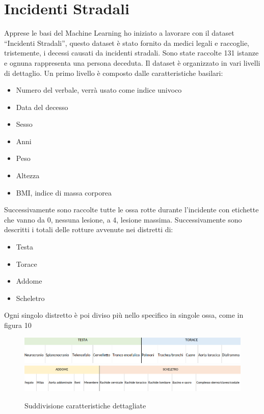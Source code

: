 \documentclass[12pt,italian]{report}
\begin{document}
\section{Incidenti Stradali}
Apprese le basi del Machine Learning ho iniziato a lavorare con il dataset ``Incidenti Stradali'', questo dataset è stato fornito da medici legali e raccoglie, tristemente, i decessi causati da incidenti stradali. Sono state raccolte 131 istanze e ognuna rappresenta una persona deceduta. Il dataset è organizzato in vari livelli di dettaglio. Un primo livello è composto dalle  caratteristiche basilari:
\begin{itemize}
	\item Numero del verbale, verrà usato come indice univoco
	\item Data del decesso
	\item Sesso
	\item Anni
	\item Peso
	\item Altezza
	\item BMI, indice di massa corporea
\end{itemize}
Successivamente sono raccolte tutte le ossa rotte durante l'incidente con etichette che vanno da 0, nessuna lesione, a 4, lesione massima.
Successivamente sono descritti i totali delle rotture avvenute nei distretti di:
\begin{itemize}
	\item Testa
	\item Torace
	\item Addome
	\item Scheletro
\end{itemize}
Ogni singolo distretto è poi diviso più nello specifico in singole ossa, come in figura 10
\begin{figure}[h]
	\centering
	\includegraphics[width = 160mm]{immagini/testa-torace-dataset}
	\includegraphics[width = 160mm]{immagini/addome-scheletro-dataset}
	\caption{Suddivisione caratteristiche dettagliate}
\end{figure}
\end{document}
